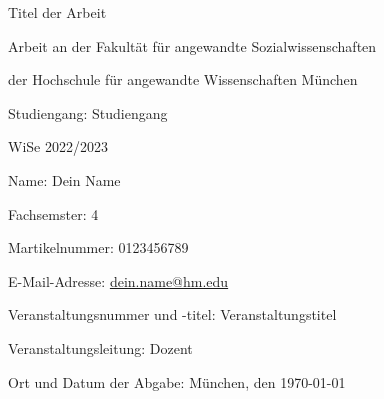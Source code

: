 \documentclass[12pt, a4paper]{article}
\title{\getTitle}
\author{\getAuthor}
\makeatletter
\newcommand*{\getUniversity}{Hochschule für angewandte Wissenschaften München}
\newcommand*{\getFaculty}{Fakultät für angewandte Sozialwissenschaften}
\newcommand*{\getTitle}{Titel der Arbeit}
\newcommand*{\getAuthor}{Dein Name}
\newcommand*{\getMail}{dein.name@hm.edu}
\newcommand*{\getMatriculationNumber}{0123456789}
\newcommand*{\getCourse}{Veranstaltungstitel}
\newcommand*{\getProgram}{Studiengang}
\newcommand*{\getSubjectSemester}{4}
\newcommand*{\getSemester}{WiSe 2022/2023}
\newcommand*{\getLecturer}{Dozent}
\newcommand*{\getSubmissionDate}{\today}
\makeatother
\begin{document}

\begin{titlepage}
    \begin{center}
        \vspace*{3cm}
          
        \Huge
        \getTitle
            
        \vspace{1cm}

			\small
			Arbeit an der \getFaculty

			der \getUniversity

			Studiengang: \getProgram

			\getSemester
            
        \vspace{1.5cm}
        \Large
        \end{center}
            
        \vfill
        
        	Name: \getAuthor
        
			Fachsemster: \getSubjectSemester

			Martikelnummer: \getMatriculationNumber

			E-Mail-Adresse: \url{\getMail}

			Veranstaltungsnummer und -titel: \getCourse

			Veranstaltungsleitung: \getLecturer

			Ort und Datum der Abgabe: München, den \getSubmissionDate
            
        \vspace{1cm}
            
\end{titlepage}


\newpage

\tableofcontents

\newpage

\end{document}
